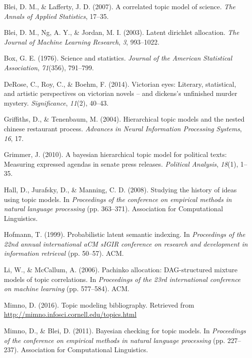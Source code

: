 \documentclass[12pt,]{article}
\begin{document}
\hypertarget{ref-blei2007correlated}{}
Blei, D. M., \& Lafferty, J. D. (2007). A correlated topic model of
science. \emph{The Annals of Applied Statistics}, 17--35.

\hypertarget{ref-blei2003latent}{}
Blei, D. M., Ng, A. Y., \& Jordan, M. I. (2003). Latent dirichlet
allocation. \emph{The Journal of Machine Learning Research}, \emph{3},
993--1022.

\hypertarget{ref-box1976science}{}
Box, G. E. (1976). Science and statistics. \emph{Journal of the American
Statistical Association}, \emph{71}(356), 791--799.

\hypertarget{ref-derose2014victorian}{}
DeRose, C., Roy, C., \& Boehm, F. (2014). Victorian eyes: Literary,
statistical, and artistic perspectives on victorian novels -- and
dickens's unfinished murder mystery. \emph{Significance}, \emph{11}(2),
40--43.

\hypertarget{ref-griffiths2004hierarchical}{}
Griffiths, D., \& Tenenbaum, M. (2004). Hierarchical topic models and
the nested chinese restaurant process. \emph{Advances in Neural
Information Processing Systems}, \emph{16}, 17.

\hypertarget{ref-grimmer2010bayesian}{}
Grimmer, J. (2010). A bayesian hierarchical topic model for political
texts: Measuring expressed agendas in senate press releases.
\emph{Political Analysis}, \emph{18}(1), 1--35.

\hypertarget{ref-hall2008studying}{}
Hall, D., Jurafsky, D., \& Manning, C. D. (2008). Studying the history
of ideas using topic models. In \emph{Proceedings of the conference on
empirical methods in natural language processing} (pp. 363--371).
Association for Computational Linguistics.

\hypertarget{ref-hofmann1999probabilistic}{}
Hofmann, T. (1999). Probabilistic latent semantic indexing. In
\emph{Proceedings of the 22nd annual international aCM sIGIR conference
on research and development in information retrieval} (pp. 50--57). ACM.

\hypertarget{ref-li2006pachinko}{}
Li, W., \& McCallum, A. (2006). Pachinko allocation: DAG-structured
mixture models of topic correlations. In \emph{Proceedings of the 23rd
international conference on machine learning} (pp. 577--584). ACM.

\hypertarget{ref-mimno2016topic}{}
Mimno, D. (2016). Topic modeling bibliography. Retrieved from
\url{http://mimno.infosci.cornell.edu/topics.html}

\hypertarget{ref-mimno2011bayesian}{}
Mimno, D., \& Blei, D. (2011). Bayesian checking for topic models. In
\emph{Proceedings of the conference on empirical methods in natural
language processing} (pp. 227--237). Association for Computational
Linguistics.
\end{document}
